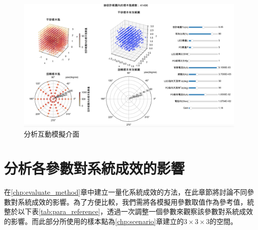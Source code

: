 \begin{figure}[htpb]
    \centering
    \includegraphics[width=15cm]{ch4pic/analysis_interactive.png}
    \caption{分析互動模擬介面}
    \label{pic:analysis_interactive}
\end{figure}





\section{分析各參數對系統成效的影響}
\label{chp:para_effect}

在\ref{chp:evaluate_method}章中建立一量化系統成效的方法，在此章節將討論不同參數對系統成效的影響。為了方便比較，我們需將各模擬用參數取值作為參考值，統整於以下表\ref{tab:para_reference}，透過一次調整一個參數來觀察該參數對系統成效的影響。而此部分所使用的樣本點為\ref{chp:scenario}章建立的$3\times 3\times 3$的空間。

